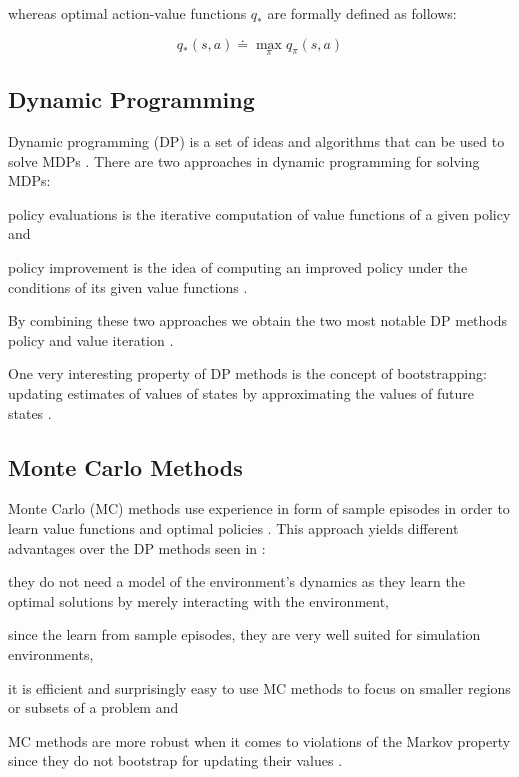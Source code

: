 \documentclass{seal_thesis}
\begin{document}
whereas optimal action-value functions $q_*$ are formally defined as follows:

\begin{equation}
	q_* (s,a) \doteq \max_\pi q_\pi (s,a)
\end{equation}

\subsection{Dynamic Programming}
\label{subsec:dp}

Dynamic programming (DP) is a set of ideas and algorithms that can be used to solve MDPs \cite[p. 95]{Sutton2017}. There are two approaches in dynamic programming for solving MDPs:
\begin{enumerate*}
	\item policy evaluations is the iterative computation of value functions of a given policy and
	\item policy improvement is the idea of computing an improved policy under the conditions of its given value functions \cite[p. 95]{Sutton2017}.
\end{enumerate*}

By combining these two approaches we obtain the two most notable DP methods \ie policy and value iteration \cite[p. 95]{Sutton2017}.

One very interesting property of DP methods is the concept of bootstrapping: updating estimates of values of states by approximating the values of future states \cite[p. 96]{Sutton2017}.

\subsection{Monte Carlo Methods}
\label{subsec:mc}

Monte Carlo (MC) methods use experience in form of sample episodes in order to learn value functions and optimal policies \cite[p. 123]{Sutton2017}. This approach yields different advantages over the DP methods seen in :
\begin{enumerate*}
	\item they do not need a model of the environment's dynamics as they learn the optimal solutions by merely interacting with the environment,
	\item since the learn from sample episodes, they are very well suited for simulation environments,
	\item it is efficient and surprisingly easy to use MC methods to focus on smaller regions or subsets of a problem and
	\item MC methods are more robust when it comes to violations of the Markov property since they do not bootstrap for updating their values \cite[p. 123]{Sutton2017}.
\end{enumerate*}
\end{document}
